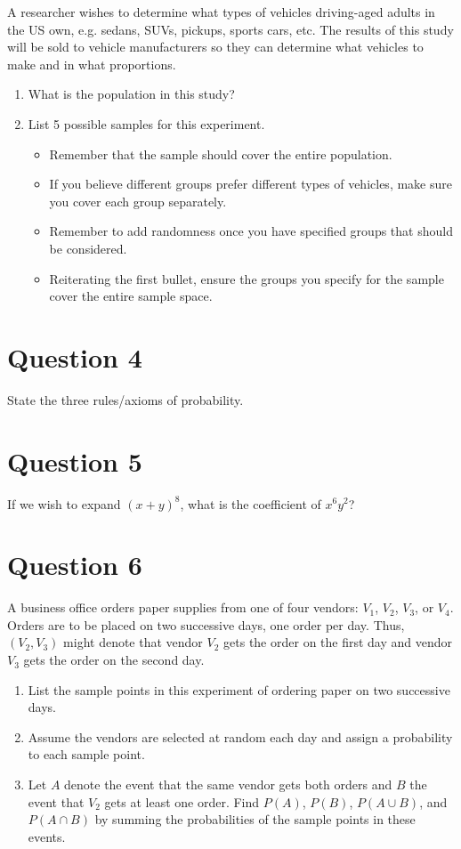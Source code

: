 \documentclass[11pt]{article}
\theoremstyle{definition}
\begin{document}
A researcher wishes to determine what types of vehicles driving-aged adults in the US own, e.g. sedans, SUVs, pickups, sports cars, etc. The results of this study will be sold to vehicle manufacturers so they can determine what vehicles to make and in what proportions.

\begin{enumerate}
	\item What is the population in this study?
	\item List 5 possible samples for this experiment.
	\begin{itemize}
		\item Remember that the sample should cover the entire population.
		\item If you believe different groups prefer different types of vehicles, make sure you cover each group separately.
		\item Remember to add randomness once you have specified groups that should be considered.
		\item Reiterating the first bullet, ensure the groups you specify for the sample cover the entire sample space.
	\end{itemize}
\end{enumerate}

\section*{Question 4}

State the three rules/axioms of probability.

\section*{Question 5}

If we wish to expand $(x + y)^8$, what is the coefficient of $x^6y^2$?

\section*{Question 6}

A business office orders paper supplies from one of four vendors: $V_1$, $V_2$, $V_3$, or $V_4$. Orders are to be placed on two successive days, one order per day. Thus, $(V_2, V_3)$ might denote that vendor $V_2$ gets the order on the first day and vendor $V_3$ gets the order on the second day.

\begin{enumerate}
	\item List the sample points in this experiment of ordering paper on two successive days.
	\item Assume the vendors are selected at random each day and assign a probability to each sample point.
	\item Let $A$ denote the event that the same vendor gets both orders and $B$ the event that $V_2$ gets at least one order. Find $P(A)$, $P(B)$, $P(A \cup B)$, and $P(A \cap B)$ by summing the probabilities of the sample points in these events.
\end{enumerate}
\end{document}
